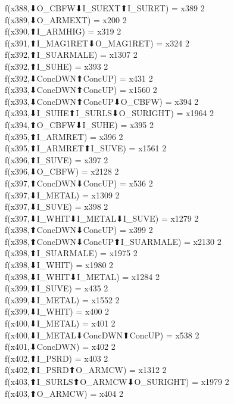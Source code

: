 f(x388,⬇O_CBFW⬇I_SUEXT⬆I_SURET) = x389 {2} \\
f(x389,⬇O_ARMEXT) = x200 {2} \\
f(x390,⬆I_ARMHIG) = x319 {2} \\
f(x391,⬆I_MAG1RET⬇O_MAG1RET) = x324 {2} \\
f(x392,⬆I_SUARMALE) = x1307 {2} \\
f(x392,⬆I_SUHE) = x393 {2} \\
f(x392,⬇ConcDWN⬆ConcUP) = x431 {2} \\
f(x393,⬇ConcDWN⬆ConcUP) = x1560 {2} \\
f(x393,⬇ConcDWN⬆ConcUP⬇O_CBFW) = x394 {2} \\
f(x393,⬇I_SUHE⬆I_SURLS⬇O_SURIGHT) = x1964 {2} \\
f(x394,⬆O_CBFW⬇I_SUHE) = x395 {2} \\
f(x395,⬆I_ARMRET) = x396 {2} \\
f(x395,⬆I_ARMRET⬆I_SUVE) = x1561 {2} \\
f(x396,⬆I_SUVE) = x397 {2} \\
f(x396,⬇O_CBFW) = x2128 {2} \\
f(x397,⬆ConcDWN⬇ConcUP) = x536 {2} \\
f(x397,⬇I_METAL) = x1309 {2} \\
f(x397,⬇I_SUVE) = x398 {2} \\
f(x397,⬇I_WHIT⬇I_METAL⬇I_SUVE) = x1279 {2} \\
f(x398,⬆ConcDWN⬇ConcUP) = x399 {2} \\
f(x398,⬆ConcDWN⬇ConcUP⬆I_SUARMALE) = x2130 {2} \\
f(x398,⬆I_SUARMALE) = x1975 {2} \\
f(x398,⬇I_WHIT) = x1980 {2} \\
f(x398,⬇I_WHIT⬇I_METAL) = x1284 {2} \\
f(x399,⬆I_SUVE) = x435 {2} \\
f(x399,⬇I_METAL) = x1552 {2} \\
f(x399,⬇I_WHIT) = x400 {2} \\
f(x400,⬇I_METAL) = x401 {2} \\
f(x400,⬇I_METAL⬇ConcDWN⬆ConcUP) = x538 {2} \\
f(x401,⬇ConcDWN) = x402 {2} \\
f(x402,⬆I_PSRD) = x403 {2} \\
f(x402,⬆I_PSRD⬆O_ARMCW) = x1312 {2} \\
f(x403,⬆I_SURLS⬆O_ARMCW⬇O_SURIGHT) = x1979 {2} \\
f(x403,⬆O_ARMCW) = x404 {2} \\
